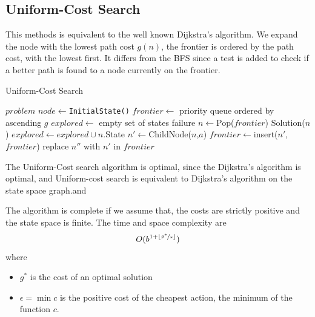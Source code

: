 \documentclass[10pt, letterpaper]{report}
\begin{document}
 \subsection{Uniform-Cost Search}
 This methods is equivalent to the well known Dijkstra's algorithm. We expand the node with the lowest path cost $g(n)$, the frontier is ordered by the path cost, with the lowest first. It differs from the BFS since a test is added to check if a better path is found to a node currently
 on the frontier.

 \begin{algorithm}
    \caption{Uniform-Cost Search}\label{alg:DFS}
    \begin{algorithmic}
    \Require $problem$
    \State $node\leftarrow$\texttt{InitialState()}
    \State $frontier\leftarrow$ priority queue ordered by ascending $g$
    \State $explored\leftarrow$ empty set of states
    \State\Return failure 
    \EndIf
    \State $n\leftarrow$Pop($frontier$)
    \State\Return Solution($n$)
    \EndIf
    $explored\leftarrow explored\cup n$.State
    \State $n'\leftarrow${ChildNode}($n$,$a$)
    \State $frontier\leftarrow$insert($n'$,$frontier$)
    \State replace $n''$ with $n'$ in $frontier$
    \EndIf
    \EndFor
    \EndWhile
    \end{algorithmic}
\end{algorithm}
\begin{theorem}
    The Uniform-Cost search algorithm is optimal, since the Dijkstra's algorithm is optimal, and Uniform-cost search is equivalent to Dijkstra's algorithm on the state space graph.and 
\end{theorem}

The algorithm is complete if we assume that, the costs are strictly positive and the state space is finite. The time and space complexity are\begin{equation}
    O(b^{1+\lfloor\nicefrac{g^*}{*}\rfloor})
\end{equation}where\begin{itemize}
    \item $g^*$ is the cost of an optimal solution 
    \item $\epsilon=\min c$ is the positive cost of the cheapest action, the minimum of the function $c$.
\end{itemize}
\end{document}
